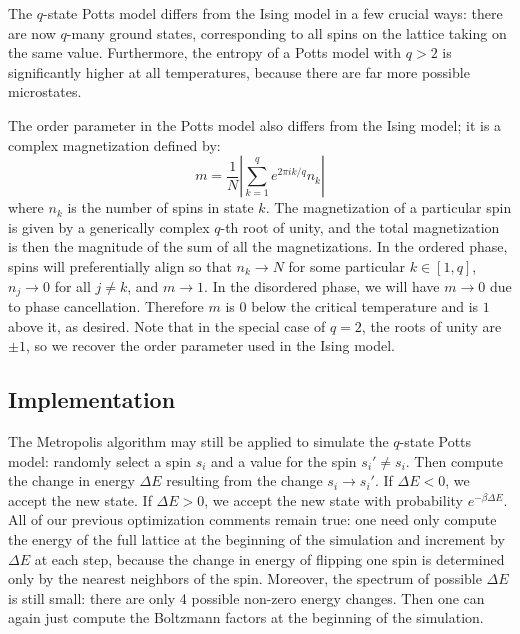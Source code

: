 \documentclass[twocolumn,aps,prl]{revtex4-1} %
\begin{document}
The $q$-state Potts model differs from the Ising model in a few crucial ways: there are now $q$-many ground states, corresponding to all spins on the lattice taking on the same value. Furthermore, the entropy of a Potts model with $q > 2$ is significantly higher at all temperatures, because there are far more possible microstates.

The order parameter in the Potts model also differs from the Ising model; it is a complex magnetization defined by:
\begin{equation}
	m = \frac{1}{N}\left|\sum_{k=1}^qe^{2\pi i k/q}n_k\right|
\end{equation}
where $n_k$ is the number of spins in state $k$. The magnetization of a particular spin is given by a generically complex $q$-th root of unity, and the total magnetization is then the magnitude of the sum of all the magnetizations. In the ordered phase, spins will preferentially align so that $n_k \to N$ for some particular $k \in [1,q]$, $n_j \to 0$ for all $j \neq k$, and $m \to 1$. In the disordered phase, we will have $m \to 0$ due to phase cancellation. Therefore $m$ is 0 below the critical temperature and is $1$ above it, as desired. Note that in the special case of $q = 2$, the roots of unity are $\pm 1$, so we recover the order parameter used in the Ising model.


\subsection{Implementation}
The Metropolis algorithm may still be applied to simulate the $q$-state Potts model: randomly select a spin $s_i$ and a value for the spin $s_i' \neq s_i$. Then compute the change in energy $\Delta E$ resulting from the change $s_i \to s_i'$. If $\Delta E < 0$, we accept the new state. If $\Delta E > 0$, we accept the new state with probability $e^{-\beta \Delta E}$. All of our previous optimization comments remain true: one need only compute the energy of the full lattice at the beginning of the simulation and increment by $\Delta E$ at each step, because the change in energy of flipping one spin is determined only by the nearest neighbors of the spin. Moreover, the spectrum of possible $\Delta E$ is still small: there are only 4 possible non-zero energy changes. Then one can again just compute the Boltzmann factors at the beginning of the simulation.
\end{document}
